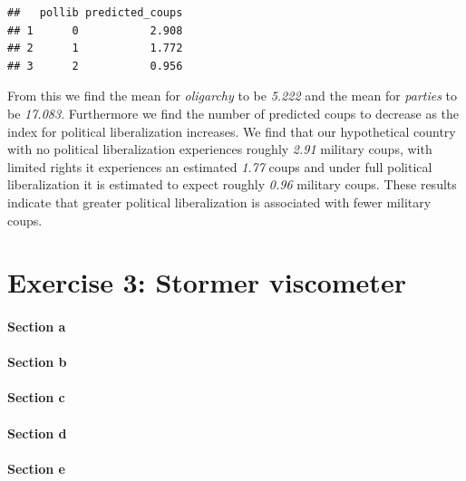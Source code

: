 \documentclass[
  11pt,
]{article}
\begin{document}
\begin{verbatim}
##   pollib predicted_coups
## 1      0           2.908
## 2      1           1.772
## 3      2           0.956
\end{verbatim}

From this we find the mean for \emph{oligarchy} to be \emph{5.222} and
the mean for \emph{parties} to be \emph{17.083}. Furthermore we find the
number of predicted coups to decrease as the index for political
liberalization increases. We find that our hypothetical country with no
political liberalization experiences roughly \emph{2.91} military coups,
with limited rights it experiences an estimated \emph{1.77} coups and
under full political liberalization it is estimated to expect roughly
\emph{0.96} military coups. These results indicate that greater
political liberalization is associated with fewer military coups.

\section{Exercise 3: Stormer
viscometer}\label{exercise-3-stormer-viscometer}

\paragraph{Section a}\label{section-a-2}

\paragraph{Section b}\label{section-b-2}

\paragraph{Section c}\label{section-c-2}

\paragraph{Section d}\label{section-d-1}

\paragraph{Section e}\label{section-e-1}
\end{document}
